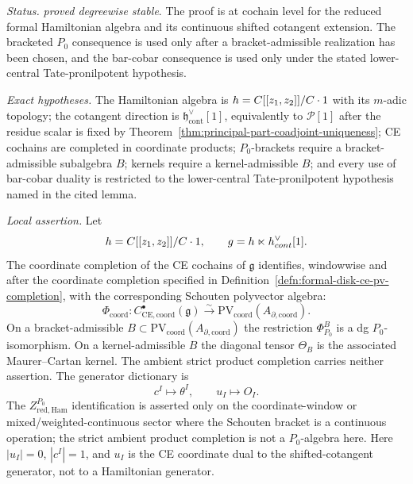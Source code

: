 \begin{stmt}\label{thm:lane-ce-pv-center}
  \emph{Status.} \emph{proved degreewise stable}.  The proof is at
  cochain level for the reduced formal Hamiltonian algebra and its
  continuous shifted cotangent extension.  The bracketed \(P_0\)
	  consequence is used only after a bracket-admissible realization has
	  been chosen, and the bar-cobar consequence is used only under the
	  stated lower-central Tate-pronilpotent hypothesis.

  \emph{Exact hypotheses.} The Hamiltonian algebra is
  \(h=C[[z_1,z_2]]/C\cdot1\) with its \(m\)-adic topology;
  the cotangent direction is
  \(\mathfrak h^\vee_{\mathrm{cont}}[1]\), equivalently to
  \(\mathcal P[1]\) after the residue scalar is fixed by
  Theorem~\ref{thm:principal-part-coadjoint-uniqueness}; CE cochains are
	  completed in coordinate products; \(P_0\)-brackets require a
	  bracket-admissible subalgebra \(B\); kernels require a
	  kernel-admissible \(B\); and every use of bar-cobar duality is
	  restricted to the lower-central Tate-pronilpotent hypothesis named in
	  the cited lemma.

  \emph{Local assertion.} Let
  \[
    h=C[[z_1,z_2]]/C\cdot1,\qquad
    g=h\ltimes
      h^\vee_{cont}[1].
  \]
  The coordinate completion of the CE cochains of \(\mathfrak g\)
  identifies, windowwise and after the coordinate completion specified in
  Definition~\ref{defn:formal-disk-ce-pv-completion}, with
  the corresponding Schouten polyvector algebra:
  \[
    \Phi_{\mathrm{coord}}\colon
    C^\bullet_{\mathrm{CE},\mathrm{coord}}(\mathfrak g)
    \xrightarrow{\sim}
    \mathrm{PV}_{\mathrm{coord}}
    (A_{\partial,\mathrm{coord}}).
  \]
  On a bracket-admissible \(B\subset
  \mathrm{PV}_{\mathrm{coord}}(A_{\partial,\mathrm{coord}})\) the
  restriction \(\Phi^B_{P_0}\) is a dg \(P_0\)-isomorphism.  On a
  kernel-admissible \(B\) the diagonal tensor \(\Theta_B\) is the
  associated Maurer--Cartan kernel.  The ambient strict product completion
  carries neither assertion.
  The generator dictionary is
  \[
    c^I\mapsto\theta^I,\qquad u_I\mapsto O_I .
  \]
  The \(Z^{P_0}_{\mathrm{red,Ham}}\) identification is asserted only on the
  coordinate-window or mixed/weighted-continuous sector where the Schouten
  bracket is a continuous operation; the strict ambient product
  completion is not a \(P_0\)-algebra here.
  Here \(|u_I|=0\), \(|c^I|=1\), and \(u_I\) is the CE coordinate dual
  to the shifted-cotangent generator, not to a Hamiltonian generator.


\end{stmt}
